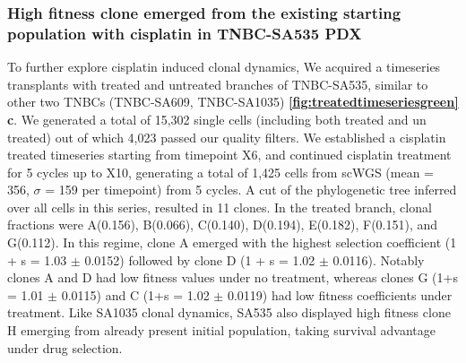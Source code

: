 \subsubsection{High fitness clone emerged from the existing starting population with cisplatin in TNBC-SA535 PDX}
To further explore cisplatin induced clonal dynamics, We acquired a timeseries transplants with treated and untreated branches of TNBC-SA535, similar to other two TNBCs (TNBC-SA609, TNBC-SA1035) \textbf{\autoref{fig:treatedtimeseriesgreen} c}.
We generated a total of 15,302 single cells (including both treated and un treated) out of which 4,023 passed our quality filters.
We established a cisplatin treated timeseries starting from timepoint X6, and continued cisplatin treatment for 5 cycles up to X10, generating a total of 1,425 cells from scWGS (mean = 356, $\sigma$ = 159 per timepoint) from 5 cycles. A cut of the phylogenetic tree inferred over all cells in this series, resulted in 11 clones. 
In the treated branch, clonal fractions were A(0.156), B(0.066), C(0.140), D(0.194), E(0.182), F(0.151), and G(0.112). In this regime, clone A emerged with the highest selection coefficient (1 + s = 1.03 $\pm$  0.0152) followed by clone D (1 + s = 1.02 $\pm$ 0.0116). Notably clones A and D had low fitness values under no treatment, whereas clones G (1+s = 1.01 $\pm$ 0.0115) and C (1+s = 1.02 $\pm$ 0.0119) had low fitness coefficients under treatment. Like SA1035 clonal dynamics, SA535 also displayed high fitness clone H emerging from already present initial population,  taking survival advantage under drug selection.



